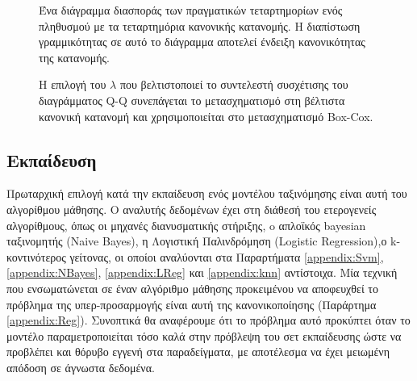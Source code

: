 	\begin{figure}[!htb]
		\begin{minipage}{0.45\textwidth}
	\caption[Διάγραμμα Quantile-Quantile]{Ένα διάγραμμα διασποράς των πραγματικών τεταρτημορίων ενός πληθυσμού με τα τεταρτημόρια κανονικής κατανομής. Η διαπίστωση γραμμικότητας σε αυτό το διάγραμμα αποτελεί ένδειξη κανονικότητας της κατανομής.}	
\end{minipage} \qquad
\begin{minipage}{0.45\textwidth}
	\caption[Επιλογή $\lambda$ Box-Cox μετασχηματισμού]{Η επιλογή του $\lambda$ που βελτιστοποιεί το συντελεστή συσχέτισης του διαγράμματος Q-Q συνεπάγεται το μετασχηματισμό στη βέλτιστα κανονική κατανομή και χρησιμοποιείται στο μετασχηματισμό Box-Cox.}

\end{minipage}
\end{figure}
	
\subsection{Εκπαίδευση}
Πρωταρχική επιλογή κατά την εκπαίδευση ενός μοντέλου ταξινόμησης είναι αυτή του αλγορίθμου μάθησης. Ο αναλυτής δεδομένων έχει στη διάθεσή του ετερογενείς αλγορίθμους, όπως οι μηχανές διανυσματικής στήριξης, o απλοϊκός bayesian ταξινομητής (Naive Bayes), η Λογιστική Παλινδρόμηση (Logistic Regression),ο k-κοντινότερος γείτονας, οι οποίοι αναλύονται στα Παραρτήματα  \ref{appendix:Svm}, \ref{appendix:NBayes}, \ref{appendix:LReg} και \ref{appendix:knn} αντίστοιχα. Μία τεχνική που ενσωματώνεται σε έναν αλγόριθμο μάθησης προκειμένου να αποφευχθεί το πρόβλημα της υπερ-προσαρμογής είναι αυτή της κανονικοποίησης (Παράρτημα \ref{appendix:Reg}). Συνοπτικά θα αναφέρουμε ότι το πρόβλημα αυτό προκύπτει όταν το μοντέλο παραμετροποιείται τόσο καλά στην πρόβλεψη του σετ εκπαίδευσης ώστε να προβλέπει και θόρυβο εγγενή στα παραδείγματα, με αποτέλεσμα να έχει μειωμένη απόδοση σε άγνωστα δεδομένα.

